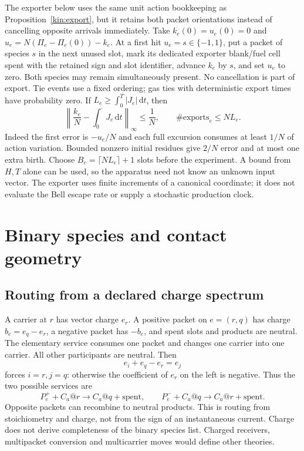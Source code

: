 \documentclass[11pt,oneside,openany]{book}
\theoremstyle{definition}
\theoremstyle{remark}\newtheorem{remark}[theorem]{Remark}
\providecommand{\dd}{\,\mathrm d}
\begin{document}
The exporter below uses the same unit action bookkeeping as
Proposition~\ref{kin:export}, but it retains both packet orientations
instead of cancelling opposite arrivals immediately.
Take $k_e(0)=u_e(0)=0$ and $u_e=N(\Pi_e-\Pi_e(0))-k_e$. At a first hit $u_e=s\in\{-1,1\}$, put a packet of species $s$ in the next unused slot, mark its dedicated exporter blank/fuel cell spent with the retained sign and slot identifier, advance $k_e$ by $s$, and set $u_e$ to zero. Both species may remain simultaneously present. No cancellation is part of export. Tie events use a fixed ordering; gas ties with deterministic export times have probability zero. If $L_e\ge\int_0^T|J_e|\dd t$, then
\begin{equation}
 \left\|\frac{k_e}{N}-\int_0^\cdot J_e\dd t\right\|_\infty\le\frac1N,
 \qquad \#\mathrm{exports}_e\le NL_e.
 \label{p:eq-export}
\end{equation}
Indeed the first error is $-u_e/N$ and each full excursion consumes at least $1/N$ of action variation. Bounded nonzero initial residues give $2/N$ error and at most one extra birth. Choose $B_e=\lceil NL_e\rceil+1$ slots before the experiment. A bound from $H,T$ alone can be used, so the apparatus need not know an unknown input vector. The exporter uses finite increments of a canonical coordinate; it does not evaluate the Bell escape rate or supply a stochastic production clock.

\section{Binary species and contact geometry}
\subsection{Routing from a declared charge spectrum}
A carrier at $r$ has vector charge $e_r$. A positive packet on $e=(r,q)$ has charge $b_e=e_q-e_r$, a negative packet has $-b_e$, and spent slots and products are neutral. The elementary service consumes one packet and changes one carrier into one carrier. All other participants are neutral. Then
\[
 e_i+e_q-e_r=e_j
\]
forces $i=r,j=q$: otherwise the coefficient of $e_r$ on the left is negative. Thus the two possible services are
\begin{equation}
 P_e^++C_a@r\longrightarrow C_a@q+\mathrm{spent},\qquad
 P_e^-+C_a@q\longrightarrow C_a@r+\mathrm{spent}.
 \label{p:eq-service}
\end{equation}
Opposite packets can recombine to neutral products. This is routing from stoichiometry and charge, not from the sign of an instantaneous current. Charge does not derive completeness of the binary species list. Charged receivers, multipacket conversion and multicarrier moves would define other theories.
\end{document}
